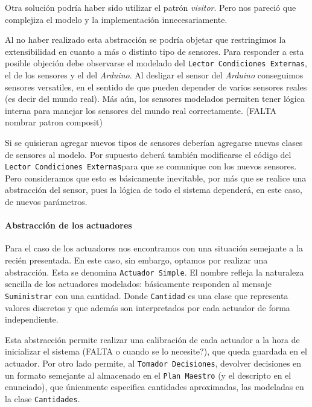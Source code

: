 \documentclass{article}
\newcommand{\condiciones}{\texttt{Lector Condiciones Externas}}
\newcommand{\decisiones}{\texttt{Tomador Decisiones}}
\begin{document}
    Otra soluci\'on podr\'ia haber sido utilizar el patr\'on \textit{visitor}.
    Pero nos pareci\'o que complejiza el modelo y la implementaci\'on innecesariamente.

    Al no haber realizado esta abstracci\'on se podr\'ia objetar que restringimos
    la extensibilidad en cuanto a m\'as o distinto tipo de sensores.
    Para responder a esta posible objeci\'on debe observarse el modelado del
    \condiciones, el de los sensores y el del
    \textit{Arduino}. Al desligar el sensor del \textit{Arduino} conseguimos
    sensores versatiles, en el sentido de que pueden depender de varios sensores
    reales (es decir del mundo real). M\'as a\'un, los sensores modelados
    permiten tener l\'ogica interna para manejar los sensores del mundo real
    correctamente.
    (FALTA nombrar patron composit)

    Si se quisieran agregar nuevos tipos de sensores deber\'ian agregarse nuevas
    clases de sensores al modelo. Por supuesto deber\'a tambi\'en modificarse
    el c\'odigo del \condiciones para que se comunique
    con los nuevos sensores. Pero consideramos que esto es b\'asicamente inevitable,
    por m\'as que se realice una abstracci\'on del sensor, pues la l\'ogica
    de todo el sistema depender\'a, en este caso, de nuevos par\'ametros.

    \paragraph{Abstracci\'on de los actuadores}
    Para el caso de los actuadores nos encontramos con una situaci\'on semejante
    a la reci\'en presentada. En este caso, sin embargo, optamos por realizar
    una abstracci\'on. Esta se denomina \texttt{Actuador Simple}. El nombre
    refleja la naturaleza sencilla de los actuadores modelados: b\'asicamente
    responden al mensaje \texttt{Suministrar} con una cantidad. Donde
    \texttt{Cantidad} es una clase que representa valores discretos y que adem\'as
    son interpretados por cada actuador de forma independiente.

    Esta abstracci\'on permite realizar una calibraci\'on de cada actuador a la
    hora de inicializar el sistema (FALTA o cuando se lo necesite?), que queda
    guardada en el actuador. Por otro lado permite, al \decisiones,
    devolver decisiones en un formato semejante al almacenado en el
    \texttt{Plan Maestro} (y el descripto en el enunciado), que \'unicamente
    especifica cantidades aproximadas, las modeladas en la clase
    \texttt{Cantidades}.
\end{document}

